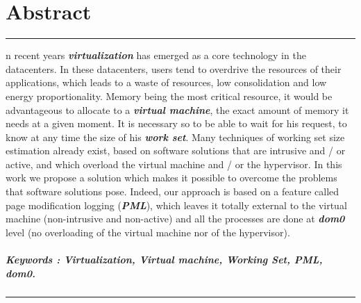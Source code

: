 %
%
%

\chapter*{Abstract}
{
\noindent\rule[3pt]{\textwidth}{1pt}
\vspace{.2cm}

n recent years \textbf{\emph{virtualization}} has emerged as a core technology in the datacenters. In these datacenters, users tend to overdrive the resources of their applications, which leads to a waste of resources, low consolidation and low energy proportionality. Memory being the most critical resource, it would be advantageous to allocate to a \textbf{\emph{virtual machine}}, the exact amount of memory it needs at a given moment. It is necessary so to be able to wait for his request, to know at any time the size of his \textbf{\emph{work set}}. Many techniques of working set size estimation already exist, based on software solutions that are intrusive and / or active, and which overload the virtual machine and / or the hypervisor. In this work we propose a solution which makes it possible to overcome the problems that software solutions pose. Indeed, our approach is based on a feature called page modification logging (\textbf{\emph{PML}}), which leaves it totally external to the virtual machine (non-intrusive and non-active) and all the processes are done at \textbf{\emph{dom0}} level (no overloading of the virtual machine nor of the hypervisor).

\paragraph{Keywords : Virtualization, Virtual machine, Working Set, PML, dom0.}

\vspace{.2cm}
\noindent\rule[3pt]{\textwidth}{1pt}
}
\clearpage